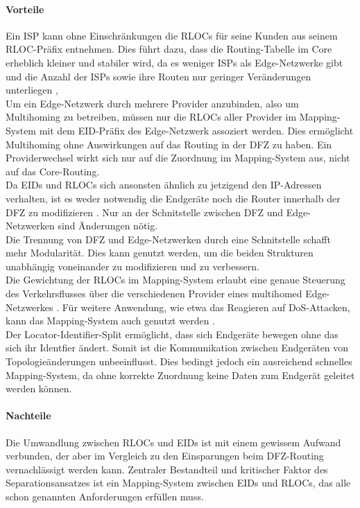 \paragraph{Vorteile}
Ein ISP kann ohne Einschränkungen die RLOCs für seine Kunden aus seinem RLOC-Präfix entnehmen. Dies führt dazu, dass die Routing-Tabelle im Core erheblich kleiner und stabiler wird, da es weniger ISPs als Edge-Netzwerke gibt und die Anzahl der ISPs sowie ihre Routen nur geringer Veränderungen unterliegen \cite{jen:2008:start},\cite{deering:1996:map} \\
Um ein Edge-Netzwerk durch mehrere Provider anzubinden, also um Multihoming zu betreiben, müssen nur die RLOCs aller Provider im Mapping-System mit dem EID-Präfix des Edge-Netzwerk assoziert werden\cite{farinacci:2009:LISP}. Dies ermöglicht Multihoming ohne Auswirkungen auf das Routing in der DFZ zu haben. Ein Providerwechsel wirkt sich nur auf die Zuordnung im  Mapping-System aus, nicht auf das Core-Routing.\\
Da EIDs und RLOCs sich ansonsten ähnlich zu jetzigend den IP-Adressen verhalten, ist es weder notwendig die Endgeräte noch die Router innerhalb der DFZ zu modifizieren \cite{jen:2008:start}. Nur an der Schnitstelle zwischen DFZ und Edge-Netzwerken sind Änderungen nötig. \\
Die Trennung von DFZ und Edge-Netzwerken durch eine Schnitstelle schafft mehr Modularität. Dies kann genutzt werden, um die beiden Strukturen unabhängig voneinander zu modifizieren und zu verbessern. \\ %
Die Gewichtung der RLOCs im Mapping-System erlaubt eine genaue Steuerung des Verkehrsflusses über die verschiedenen Provider eines multihomed Edge-Netzwerkes \cite{mathy:2008:dht}. Für weitere Anwendung, wie etwa das Reagieren auf DoS-Attacken, kann das Mapping-System auch genutzt werden \cite{jen:2008:start}. \\
Der Locator-Identifier-Split ermöglicht, dass sich Endgeräte bewegen ohne das sich ihr Identfier ändert. Somit ist die Kommunikation zwischen Endgeräten von Topologieänderungen unbeeinflusst. Dies bedingt jedoch ein ausreichend schnelles Mapping-System, da ohne korrekte Zuordnung keine Daten zum Endgerät geleitet werden können.

\paragraph{Nachteile}
Die Umwandlung zwischen RLOCs und EIDs ist mit einem gewissem Aufwand verbunden, der aber im Vergleich zu den Einsparungen beim DFZ-Routing vernachlässigt werden kann. Zentraler Bestandteil und kritischer Faktor des Separationsansatzes ist ein Mapping-System zwischen EIDs und RLOCs, das alle schon genannten Anforderungen erfüllen muss. 


